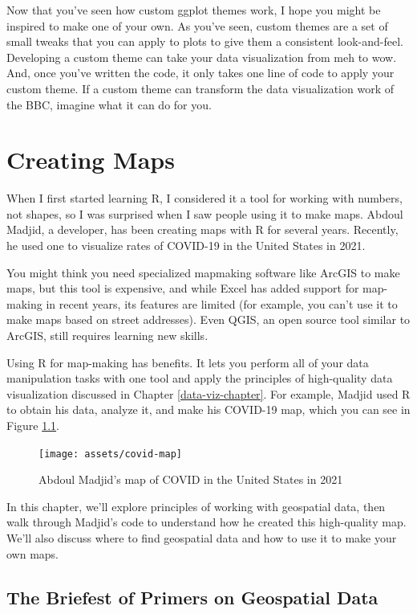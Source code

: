 \documentclass[
]{book}
\begin{document}
Now that you've seen how custom ggplot themes work, I hope you might be inspired to make one of your own. As you've seen, custom themes are a set of small tweaks that you can apply to plots to give them a consistent look-and-feel. Developing a custom theme can take your data visualization from meh to wow. And, once you've written the code, it only takes one line of code to apply your custom theme. If a custom theme can transform the data visualization work of the BBC, imagine what it can do for you.

\hypertarget{maps-chapter}{%
\chapter{Creating Maps}\label{maps-chapter}}

When I first started learning R, I considered it a tool for working with numbers, not shapes, so I was surprised when I saw people using it to make maps. Abdoul Madjid, a developer, has been creating maps with R for several years. Recently, he used one to visualize rates of COVID-19 in the United States in 2021.

You might think you need specialized mapmaking software like ArcGIS to make maps, but this tool is expensive, and while Excel has added support for map-making in recent years, its features are limited (for example, you can't use it to make maps based on street addresses). Even QGIS, an open source tool similar to ArcGIS, still requires learning new skills.

Using R for map-making has benefits. It lets you perform all of your data manipulation tasks with one tool and apply the principles of high-quality data visualization discussed in Chapter \ref{data-viz-chapter}. For example, Madjid used R to obtain his data, analyze it, and make his COVID-19 map, which you can see in Figure \ref{fig:madjid-covid-map}.

\begin{figure}
\texttt{[image: assets/covid-map]} \caption{Abdoul Madjid's map of COVID in the United States in 2021}\label{fig:madjid-covid-map}
\end{figure}

In this chapter, we'll explore principles of working with geospatial data, then walk through Madjid's code to understand how he created this high-quality map. We'll also discuss where to find geospatial data and how to use it to make your own maps.

\hypertarget{the-briefest-of-primers-on-geospatial-data}{%
\section*{The Briefest of Primers on Geospatial Data}\label{the-briefest-of-primers-on-geospatial-data}}
\end{document}
